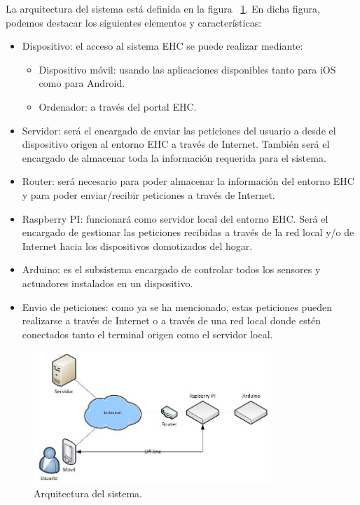 La arquitectura del sistema está definida en la figura ~\ref{fig:arquitectura}. En dicha figura, podemos destacar los siguientes elementos y características:
\begin{itemize}
\item Dispositivo: el acceso al sistema EHC se puede realizar mediante:
\begin{itemize}
\item Dispositivo móvil: usando las aplicaciones disponibles tanto para iOS como para Android.
\item Ordenador: a través del portal EHC.
\end{itemize}
\item Servidor: será el encargado de enviar las peticiones del usuario a desde el dispositivo origen al entorno EHC a través de Internet. También será el encargado de almacenar toda la información requerida para el sistema.
\item Router: será necesario para poder almacenar la información del entorno EHC y para poder enviar/recibir peticiones a través de Internet.
\item Raspberry PI: funcionará como servidor local del entorno EHC. Será el encargado de gestionar las peticiones recibidas a través de la red local y/o de Internet hacia los dispositivos domotizados del hogar.
\item Arduino: es el subsistema encargado de controlar todos los sensores y actuadores instalados en un dispositivo.
\item Envio de peticiones: como ya se ha mencionado, estas peticiones pueden realizarse a través de Internet o a través de una red local donde estén conectados tanto el terminal origen como el servidor local.
\end{itemize}

\begin{figure}[h!]
	\centering
	\includegraphics[width=0.8\textwidth]{4.Disenio/Imagenes/arquitectura}
	\caption{Arquitectura del sistema.}
	\label{fig:arquitectura}
\end{figure}



